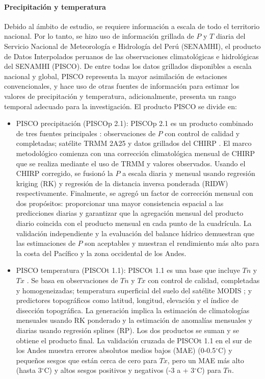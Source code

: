 \documentclass[12pt]{article}
\begin{document}
\paragraph{Precipitación y temperatura}\mbox{}

Debido al ámbito de estudio, se requiere información a escala de todo el territorio nacional. Por lo tanto, se hizo uso de información grillada de $P$ y $T$ diaria del Servicio Nacional de Meteorología e Hidrología del Perú (SENAMHI), el producto de Datos Interpolados peruanos de las observaciones climatológicas e hidrológicas del SENAMHI (PISCO). De entre todas los datos grillados disponibles a escala nacional y global, PISCO representa la mayor asimilación de estaciones convencionales, y hace uso de otras fuentes de información para estimar los valores de precipitación y temperatura, adicionalmente, presenta un rango temporal adecuado para la investigación. El producto PISCO se divide en:

\begin{itemize}
	\item PISCO precipitación (PISCOp 2.1): PISCOp 2.1 es un producto combinado de tres fuentes principales \citep{Aybar2019}: observaciones de $P$ con control de calidad y completadas; satélite TRMM 2A25 \citep{iguchi2000rain} y datos grillados del CHIRP \citep{funk2015climate}. El marco metodológico comienza con una corrección climatológica mensual de CHIRP que se realiza mediante el uso de TRMM y valores observados. Usando el CHIRP corregido, se fusionó la $P$ a escala diaria y mensual usando regresión kriging (RK) y regresión de la distancia inversa ponderada (RIDW) respectivamente. Finalmente, se agregó un factor de corrección mensual con dos propósitos: proporcionar una mayor consistencia espacial a las predicciones diarias y garantizar que la agregación mensual del producto diario coincida con el producto mensual en cada punto de la cuadrícula. La validación independiente y la evaluación del balance hídrico demuestran que las estimaciones de $P$ son aceptables y muestran el rendimiento más alto para la costa del Pacífico y la zona occidental de los Andes.

\clearpage
	
	\item PISCO temperatura (PISCOt 1.1): PISCOt 1.1 es una base que incluye $Tn$ y $Tx$ \citep{Huerta2019}. Se basa en observaciones de $Tn$ y $Tx$ con control de calidad, completadas y homogeneizadas; temperatura superficial del suelo del satélite MODIS \citep{jin2010land}; y predictores topográficos como latitud, longitud, elevación y el índice de disección topográfica. La generación implica la estimación de climatologías mensuales usando RK ponderado y la estimación de anomalías mensuales y diarias usando regresión splines (RP). Los dos productos se suman y se obtiene el producto final. La validación cruzada de PISCOt 1.1 en el sur de los Andes muestra errores absolutos medios bajos (MAE) (0-0.5$^{\circ}$C) y pequeños sesgos que están cerca de cero para $Tx$, pero un MAE más alto (hasta 3$^{\circ}$C) y altos sesgos positivos y negativos (-3 a + 3$^{\circ}$C) para $Tn$.
	
\end{itemize}
\end{document}
